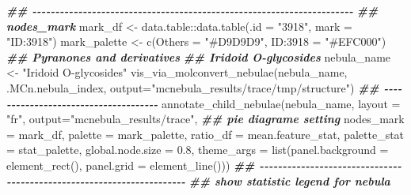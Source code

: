 \documentclass[
]{article}
\newenvironment{Shaded}{\begin{snugshade}}{\end{snugshade}}
\newcommand{\AttributeTok}[1]{\textcolor[rgb]{0.77,0.63,0.00}{#1}}
\newcommand{\DocumentationTok}[1]{\textcolor[rgb]{0.56,0.35,0.01}{\textbf{\textit{#1}}}}
\newcommand{\FloatTok}[1]{\textcolor[rgb]{0.00,0.00,0.81}{#1}}
\newcommand{\FunctionTok}[1]{\textcolor[rgb]{0.00,0.00,0.00}{#1}}
\newcommand{\NormalTok}[1]{#1}
\newcommand{\OtherTok}[1]{\textcolor[rgb]{0.56,0.35,0.01}{#1}}
\newcommand{\SpecialCharTok}[1]{\textcolor[rgb]{0.00,0.00,0.00}{#1}}
\newcommand{\StringTok}[1]{\textcolor[rgb]{0.31,0.60,0.02}{#1}}
\begin{document}
\begin{Shaded}
\begin{Highlighting}[]
\DocumentationTok{\#\# {-}{-}{-}{-}{-}{-}{-}{-}{-}{-}{-}{-}{-}{-}{-}{-}{-}{-}{-}{-}{-}{-}{-}{-}{-}{-}{-}{-}{-}{-}{-}{-}{-}{-}{-}{-}{-}{-}{-}{-}{-}{-}{-}{-}{-}{-}{-}{-}{-}{-}{-}{-}{-}{-}{-}{-}{-}{-}{-}{-}{-}{-}{-}{-}{-}{-}{-}{-}{-}{-} }
\DocumentationTok{\#\# nodes\_mark}
\NormalTok{mark\_df }\OtherTok{\textless{}{-}}\NormalTok{ data.table}\SpecialCharTok{::}\FunctionTok{data.table}\NormalTok{(}\AttributeTok{.id =} \StringTok{"3918"}\NormalTok{,}
                                  \AttributeTok{mark =} \StringTok{"ID:3918"}\NormalTok{)}
\NormalTok{mark\_palette }\OtherTok{\textless{}{-}} \FunctionTok{c}\NormalTok{(}\AttributeTok{Others =} \StringTok{"\#D9D9D9"}\NormalTok{, }\StringTok{\textasciigrave{}}\AttributeTok{ID:3918}\StringTok{\textasciigrave{}} \OtherTok{=} \StringTok{"\#EFC000"}\NormalTok{)}
\DocumentationTok{\#\# Pyranones and derivatives}
\DocumentationTok{\#\# Iridoid O{-}glycosides}
\NormalTok{nebula\_name }\OtherTok{\textless{}{-}} \StringTok{"Iridoid O{-}glycosides"}
\FunctionTok{vis\_via\_molconvert\_nebulae}\NormalTok{(nebula\_name, .MCn.nebula\_index,}
                           \AttributeTok{output=}\StringTok{"mcnebula\_results/trace/tmp/structure"}\NormalTok{)}
\DocumentationTok{\#\# {-}{-}{-}{-}{-}{-}{-}{-}{-}{-}{-}{-}{-}{-}{-}{-}{-}{-}{-}{-}{-}{-}{-}{-}{-}{-}{-}{-}{-}{-}{-}{-}{-}{-}{-}{-}{-} }
\FunctionTok{annotate\_child\_nebulae}\NormalTok{(nebula\_name,}
                       \AttributeTok{layout =} \StringTok{"fr"}\NormalTok{,}
                       \AttributeTok{output=}\StringTok{"mcnebula\_results/trace"}\NormalTok{,}
                       \DocumentationTok{\#\# pie diagrame setting}
                       \AttributeTok{nodes\_mark =}\NormalTok{ mark\_df,}
                       \AttributeTok{palette =}\NormalTok{ mark\_palette,}
                       \AttributeTok{ratio\_df =}\NormalTok{ mean.feature\_stat,}
                       \AttributeTok{palette\_stat =}\NormalTok{ stat\_palette,}
                       \AttributeTok{global.node.size =} \FloatTok{0.8}\NormalTok{,}
                       \AttributeTok{theme\_args =} \FunctionTok{list}\NormalTok{(}\AttributeTok{panel.background =} \FunctionTok{element\_rect}\NormalTok{(),}
                                         \AttributeTok{panel.grid =} \FunctionTok{element\_line}\NormalTok{()))}
\DocumentationTok{\#\# {-}{-}{-}{-}{-}{-}{-}{-}{-}{-}{-}{-}{-}{-}{-}{-}{-}{-}{-}{-}{-}{-}{-}{-}{-}{-}{-}{-}{-}{-}{-}{-}{-}{-}{-}{-}{-}{-}{-}{-}{-}{-}{-}{-}{-}{-}{-}{-}{-}{-}{-}{-}{-}{-}{-}{-}{-}{-}{-}{-}{-}{-}{-}{-}{-}{-}{-}{-}{-}{-} }
\DocumentationTok{\#\# show statistic legend for nebula}
\end{Highlighting}
\end{Shaded}
\end{document}
